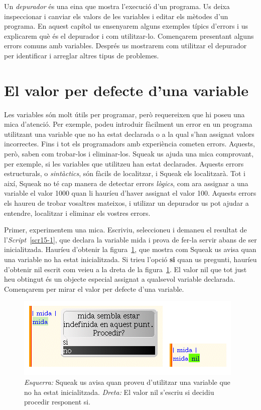 Un \emph{depurador} és una eina que mostra l'execució d'un programa. Us deixa inspeccionar i canviar els valors de les variables i editar els mètodes d'un programa. En aquest capítol us ensenyarem alguns exemples típics d'errors i us explicarem què és el depurador i com utilitzar-lo. Començarem presentant alguns errors comuns amb variables. Després us mostrarem com utilitzar el depurador per identificar i arreglar altres tipus de problemes. 

\section{El valor per defecte d'una variable}
Les variables són molt útils per programar, però requereixen que hi poseu una mica d'atenció. Per exemple, podeu introduir
fàcilment un error en un programa utilitzant una variable que no ha estat declarada o a la qual s'han assignat valors incorrectes. Fins i tot els programadors amb experiència cometen errors. Aquests, però, saben com trobar-los i eliminar-los. Squeak us ajuda una mica comprovant, per exemple, si les variables que utilitzeu han estat declarades. Aquests errors estructurals, o \emph{sintàctics}, són fàcils de localitzar, i Squeak els localitzarà. Tot i així, Squeak no té cap manera de detectar errors \emph{lògics}, com ara assignar a una variable el valor 1000 quan li hauríeu d'haver assignat el valor 100. Aquests errors els haureu de trobar vosaltres mateixos, i utilizar un depurador us pot ajudar a entendre, localitzar i eliminar els vostres errors.

Primer, experimentem una mica. Escriviu, seleccioneu i demaneu el resultat de l'\emph{Script}~\ref{scr15-1}, que declara la variable \textsf{mida} i prova de fer-la servir abans de ser inicialitzada. Hauríeu d'obtenir la figura~\ref{fig1501}, que mostra com Squeak us avisa quan una variable no ha estat inicialitzada. Si trieu l'opció \textbf{si} quan us pregunti, hauríeu d'obtenir \textsf{nil} escrit com veieu a la dreta de la figura~\ref{fig1501}. El valor \textsf{nil} que tot just heu obtingut és un objecte especial assignat a qualsevol variable declarada. Començarem per mirar el valor per defecte d'una variable.
\begin{figure}[h]
\begin{center}
\includegraphics[scale=3.0]{Imatges/figura15-1.png}
\end{center}
\caption{\emph{Esquerra:} Squeak us avisa quan proveu d'utilitzar una variable que no ha estat inicialitzada.
\emph{Dreta:} El valor \textsf{\upshape nil} s'escriu si decidiu procedir responent \textsf{\upshape si}.}
\label{fig1501}
\end{figure}

